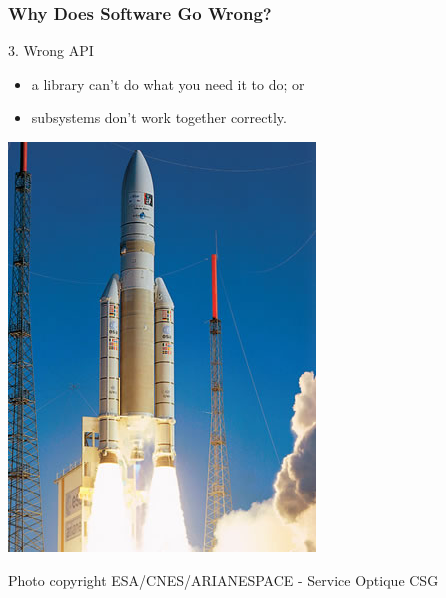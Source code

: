 \documentclass{beamer}
\newenvironment{changemargin}[1]{%
  \begin{list}{}{%
    \setlength{\topsep}{0pt}%
    \setlength{\leftmargin}{#1}%
    \setlength{\rightmargin}{1em}
    \setlength{\listparindent}{\parindent}%
    \setlength{\itemindent}{\parindent}%
    \setlength{\parsep}{\parskip}%
  }%
  \item[]}{\end{list}}
\begin{document}
\begin{frame}

  \frametitle{Why Does Software Go Wrong?}

  \begin{changemargin}{2em}
    3. Wrong API
\begin{itemize}
  \item a library can't do what you need it to do; or
  \item subsystems don't work together correctly.
\end{itemize}

\begin{center}
\includegraphics[height=.5\textheight]{L01/s2_2sm.jpg}
\end{center}

{\tiny Photo copyright ESA/CNES/ARIANESPACE - Service Optique CSG}
  \end{changemargin}
  
\end{frame}
\end{document}
